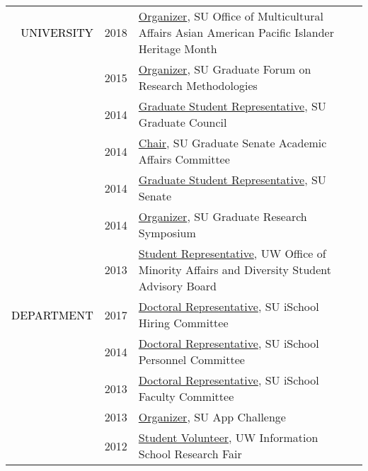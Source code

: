 \documentclass[12pt]{article}
\begin{document}
{{\begin{longtable}{Rp{1.0in}p{0.25in}p{4.75in}}
\textcolor{black}{\footnotesize{\uppercase{University}}} & \footnotesize{2018} & \href{http://dailyorange.com/2018/04/asian-american-pacific-islander-students-celebrate-place-syracuse-university/}{{Organizer}}, SU Office of Multicultural Affairs Asian American Pacific Islander Heritage Month \\

& \footnotesize{2015} & \href{http://gradresearch.syr.edu}{{Organizer}}, SU Graduate Forum on Research Methodologies \\

& \footnotesize{2014} & \href{http://gradorg.syr.edu/senate/committees/}{{Graduate Student Representative}}, SU Graduate Council \\

& \footnotesize{2014} & \href{http://gradorg.syr.edu/senate/committees/}{{Chair}}, SU Graduate Senate Academic Affairs Committee \\

& \footnotesize{2014} & \href{http://universitysenate.syr.edu/}{{Graduate Student Representative}}, SU Senate \\

& \footnotesize{2014} & \href{https://www.facebook.com/sugrads/photos/tab=album\&album\_id=874022975972914}{{Organizer}}, SU Graduate Research Symposium \\

& \footnotesize{2013} & \href{http://www.washington.edu/omad/2014/05/09/no-longer-invisible-bryan-dosono/}{{Student Representative}}, UW Office of Minority Affairs and Diversity Student Advisory Board \\

\textcolor{black}{\footnotesize{\uppercase{Department}}} & \footnotesize{2017} & 
 \href{http://ischool.syr.edu/facstaff/}{{Doctoral Representative}}, SU iSchool Hiring Committee \\

& \footnotesize{2014} & \href{http://ischool.syr.edu/facstaff/}{{Doctoral Representative}}, SU iSchool Personnel Committee \\

& \footnotesize{2013} & \href{http://ischool.syr.edu/facstaff/}{{Doctoral Representative}}, SU iSchool Faculty Committee \\

& \footnotesize{2013} & \href{http://appchallenge.syr.edu/}{{Organizer}}, SU App Challenge \\

& \footnotesize{2012} & \href{http://ischool.uw.edu/current/career-services}{{Student Volunteer}}, UW Information School Research Fair \\


\end{longtable}}}
\end{document}
